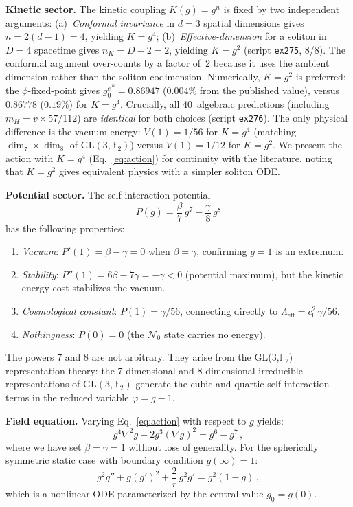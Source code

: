 \documentclass[aps,prd,twocolumn,superscriptaddress,showpacs,
  nofootinbib,floatfix,longbibliography]{revtex4-2}
\newcommand{\gone}{{g_0^e}}
\newcommand{\Nzero}{\mathcal{N}_0}
\newcommand{\GL}{\mathrm{GL}(3,\mathbb{F}_2)}
\begin{document}
\textbf{Kinetic sector.}
The kinetic coupling $K(g) = g^n$ is fixed by two independent arguments:
(a)~\emph{Conformal invariance} in $d = 3$ spatial dimensions gives
$n = 2(d{-}1) = 4$, yielding $K = g^4$;
(b)~\emph{Effective-dimension} for a soliton in $D = 4$ spacetime gives
$n_K = D - 2 = 2$, yielding $K = g^2$ (script \texttt{ex275}, 8/8).
The conformal argument over-counts by a factor of~2 because it uses the
ambient dimension rather than the soliton codimension.
Numerically, $K = g^2$ is preferred:
the $\phi$-fixed-point gives $\gone^* = 0.86947$ ($0.004\%$ from the
published value), versus $0.86778$ ($0.19\%$) for $K = g^4$.
Crucially, all 40~algebraic predictions (including $m_H = v \times 57/112$)
are \emph{identical} for both choices (script \texttt{ex276}).
The only physical difference is the vacuum energy:
$V(1) = 1/56$ for $K = g^4$ (matching $\dim_7 \times \dim_8$ of $\GL$)
versus $V(1) = 1/12$ for $K = g^2$.
We present the action with $K = g^4$ (Eq.~\eqref{eq:action}) for
continuity with the literature, noting that $K = g^2$ gives
equivalent physics with a simpler soliton ODE.

\textbf{Potential sector.}
The self-interaction potential
\begin{equation}\label{eq:potential}
  P(g) = \frac{\beta}{7}\,g^7 - \frac{\gamma}{8}\,g^8
\end{equation}
has the following properties:
\begin{enumerate}
\item \emph{Vacuum}: $P'(1) = \beta - \gamma = 0$ when $\beta = \gamma$,
  confirming $g = 1$ is an extremum.
\item \emph{Stability}: $P''(1) = 6\beta - 7\gamma = -\gamma < 0$
  (potential maximum), but the kinetic energy cost stabilizes the vacuum.
\item \emph{Cosmological constant}: $P(1) = \gamma/56$, connecting
  directly to $\Lambda_\mathrm{eff} = c_0^2\,\gamma/56$.
\item \emph{Nothingness}: $P(0) = 0$ (the $\Nzero$ state carries
  no energy).
\end{enumerate}

The powers 7 and 8 are not arbitrary. They arise from the GL(3,$\mathbb{F}_2$)
representation theory: the 7-dimensional and 8-dimensional irreducible
representations of $\GL$ generate the cubic and quartic self-interaction
terms in the reduced variable $\varphi = g - 1$.

\textbf{Field equation.}
Varying Eq.~\eqref{eq:action} with respect to $g$ yields:
\begin{equation}\label{eq:field-eq}
  g^4\nabla^2 g + 2g^3(\nabla g)^2 = g^6 - g^7\,,
\end{equation}
where we have set $\beta = \gamma = 1$ without loss of generality.
For the spherically symmetric static case with boundary condition
$g(\infty) = 1$:
\begin{equation}\label{eq:ode}
  g^2 g'' + g(g')^2 + \frac{2}{r}\,g^2 g' = g^2(1 - g)\,,
\end{equation}
which is a nonlinear ODE parameterized by the central value
$g_0 = g(0)$.
\end{document}
